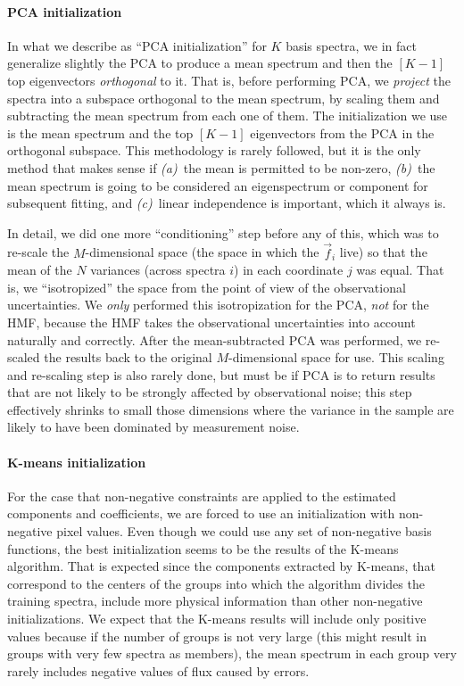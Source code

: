 \documentclass[12pt,preprint]{aastex}
\begin{document}
\paragraph{PCA initialization}
In what we describe as ``PCA initialization'' for $K$ basis spectra,
we in fact generalize slightly the PCA to produce a mean spectrum and
then the $[K-1]$ top eigenvectors \emph{orthogonal} to it. 
That is, before performing PCA, we \emph{project} the spectra into a 
subspace orthogonal to the mean spectrum, by scaling them 
and subtracting the mean spectrum from each one of them.
The initialization we use is the mean spectrum
and the top $[K-1]$ eigenvectors from the PCA in the orthogonal
subspace.  This methodology is rarely followed, but it is the only
method that makes sense if \textsl{(a)}~the mean is permitted to be
non-zero, \textsl{(b)}~the mean spectrum is going to be considered an
eigenspectrum or component for subsequent fitting, and
\textsl{(c)}~linear independence is important, which it always is.

In detail, we did one more ``conditioning'' step before any of this,
which was to re-scale the $M$-dimensional space (the space in which
the $\vec{f}_i$ live) so that the mean of the $N$
variances (across spectra $i$) in each coordinate $j$ was
equal.  That is, we ``isotropized'' the space from the point of view
of the observational uncertainties.  We \emph{only} performed this
isotropization for the PCA, \emph{not} for the HMF, because the HMF
takes the observational uncertainties into account naturally and
correctly.  After the mean-subtracted PCA was performed, we re-scaled
the results back to the original $M$-dimensional space for use.  This
scaling and re-scaling step is also rarely done, but must be if PCA is
to return results that are not likely to be strongly affected by
observational noise; this step effectively shrinks to small those
dimensions where the variance in the sample are likely to have been
dominated by measurement noise.

\paragraph{K-means initialization}
For the case that non-negative constraints are applied to the
estimated components and coefficients, we are forced to use an
initialization with non-negative pixel values. Even though we could
use any set of non-negative basis functions, the best initialization
seems to be the results of the K-means algorithm. That is expected
since the components extracted by K-means, that correspond to the
centers of the groups into which the algorithm divides the training
spectra, include more physical information than other non-negative
initializations. We expect that the K-means results will include only
positive values because if the number of groups is not very large
(this might result in groups with very few spectra as members), the
mean spectrum in each group very rarely includes negative values of
flux caused by errors.
\end{document}
